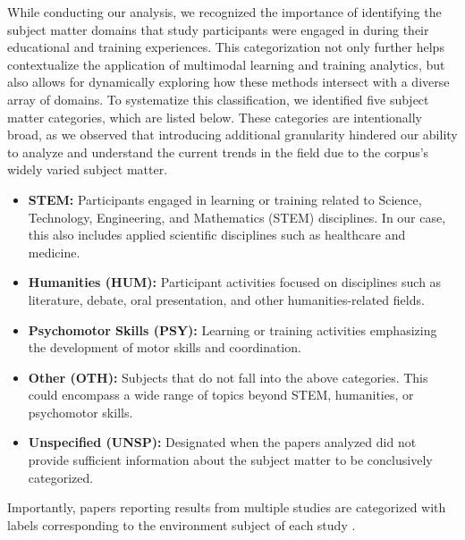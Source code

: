 \documentclass[manuscript,screen,review]{acmart}
\begin{document}
While conducting our analysis, we recognized the importance of identifying the subject matter domains that study participants were engaged in during their educational and training experiences. This categorization not only further helps contextualize the application of multimodal learning and training analytics, but also allows for dynamically exploring how these methods intersect with a diverse array of domains. To systematize this classification, we identified five subject matter categories, which are listed below. These categories are intentionally broad, as we observed that introducing additional granularity %
hindered our ability to analyze and understand the current trends in the field due to the corpus's widely varied subject matter.
\begin{itemize}
    \item \textbf{STEM:} Participants engaged in learning or training related to Science, Technology, Engineering, and Mathematics (STEM) disciplines. In our case, this also includes applied scientific disciplines such as healthcare and medicine.
    \item \textbf{Humanities (HUM):} Participant activities focused on disciplines such as literature, debate, oral presentation, and other humanities-related fields.
    \item \textbf{Psychomotor Skills (PSY):}  Learning or training activities emphasizing the development of motor skills and coordination.
    \item \textbf{Other (OTH):} Subjects that do not fall into the above categories. This could encompass a wide range of topics beyond STEM, humanities, or psychomotor skills.
    \item \textbf{Unspecified (UNSP):} Designated when the papers analyzed did not provide sufficient information about the subject matter to be conclusively categorized.
\end{itemize}

Importantly, papers reporting results from multiple studies are categorized with labels corresponding to the environment subject of each study \cite{3796643912,2055153191}. 
\end{document}
